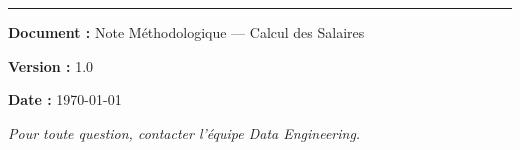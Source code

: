 \documentclass[12pt,a4paper,french]{article}
\begin{document}
\vfill

\begin{center}
    \textcolor{accentblue}{\rule{10cm}{1pt}}

    \smallskip
    \textbf{Document :} Note Méthodologique — Calcul des Salaires

    \textbf{Version :} 1.0

    \textbf{Date :} \today

    \smallskip
    \textit{Pour toute question, contacter l'équipe Data Engineering.}
\end{center}
\end{document}
